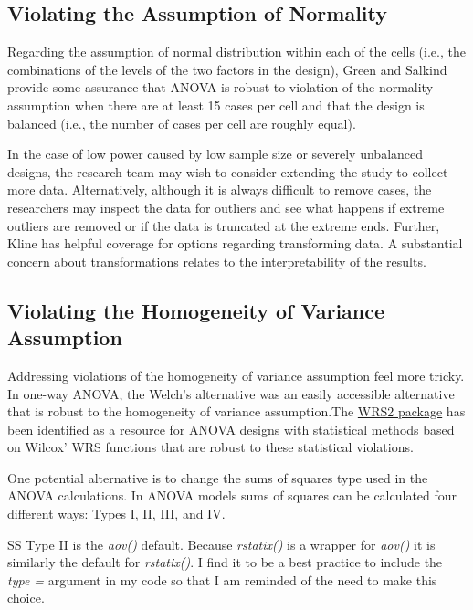 \documentclass[
  11pt,
]{book}
\begin{document}
\hypertarget{violating-the-assumption-of-normality}{%
\subsection{Violating the Assumption of Normality}\label{violating-the-assumption-of-normality}}

Regarding the assumption of normal distribution within each of the cells (i.e., the combinations of the levels of the two factors in the design), Green and Salkind \citeyearpar{green_using_2017} provide some assurance that ANOVA is robust to violation of the normality assumption when there are at least 15 cases per cell and that the design is balanced (i.e., the number of cases per cell are roughly equal).

In the case of low power caused by low sample size or severely unbalanced designs, the research team may wish to consider extending the study to collect more data. Alternatively, although it is always difficult to remove cases, the researchers may inspect the data for outliers and see what happens if extreme outliers are removed or if the data is truncated at the extreme ends. Further, Kline \citeyearpar{kline_data_2016} has helpful coverage for options regarding transforming data. A substantial concern about transformations relates to the interpretability of the results.

\hypertarget{violating-the-homogeneity-of-variance-assumption}{%
\subsection{Violating the Homogeneity of Variance Assumption}\label{violating-the-homogeneity-of-variance-assumption}}

Addressing violations of the homogeneity of variance assumption feel more tricky. In one-way ANOVA, the Welch's alternative was an easily accessible alternative that is robust to the homogeneity of variance assumption.The \href{https://cran.r-project.org/web/packages/WRS2/index.html}{WRS2 package} has been identified as a resource for ANOVA designs with statistical methods based on Wilcox' WRS functions that are robust to these statistical violations.

One potential alternative is to change the sums of squares type used in the ANOVA calculations. In ANOVA models sums of squares can be calculated four different ways: Types I, II, III, and IV.

SS Type II is the \emph{aov()} default. Because \emph{rstatix()} is a wrapper for \emph{aov()} it is similarly the default for \emph{rstatix()}. I find it to be a best practice to include the \emph{type = } argument in my code so that I am reminded of the need to make this choice.
\end{document}
